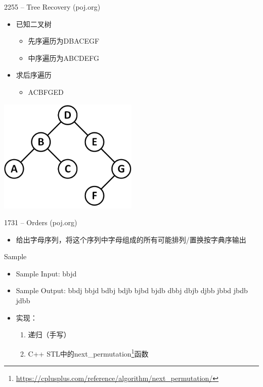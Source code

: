\begin{frame}{2255 -- Tree Recovery (poj.org)}
    \begin{itemize}
        \item 已知二叉树
        \begin{itemize}
            \item 先序遍历为DBACEGF
            \item 中序遍历为ABCDEFG
        \end{itemize}
        \item 求后序遍历
        \begin{itemize}
            \item ACBFGED
        \end{itemize}
    \end{itemize}
    \includegraphics[width=0.5\textwidth, right]{fig/2-2.png}
\end{frame}
\begin{frame}{1731 -- Orders (poj.org)}
    \begin{itemize}
        \item 给出字母序列，将这个序列中字母组成的所有可能排列/置换按字典序输出
    \end{itemize}
    \vfill
    \begin{exampleblock}{Sample}
        \begin{itemize}
            \item Sample Input: bbjd
            \item Sample Output: bbdj bbjd bdbj bdjb bjbd bjdb dbbj dbjb djbb jbbd jbdb jdbb
        \end{itemize}
    \end{exampleblock}
    \vfill
    \begin{itemize}
        \item 实现：
        \begin{enumerate}
            \item 递归（手写）
            \item C++ STL中的next\_permutation\footnote{\url{https://cplusplus.com/reference/algorithm/next_permutation/}}函数
        \end{enumerate}
    \end{itemize}
\end{frame}
